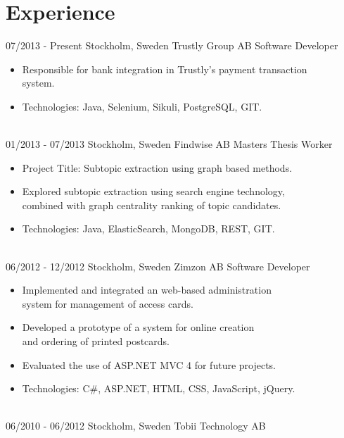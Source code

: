 \documentclass{markusos-cv}
\begin{document}

\section{Experience}

\begin{entrylist}
\entry
{07/2013 - Present}
{Stockholm, Sweden}
{Trustly Group AB}
{Software Developer} 
{
\begin{itemize}
\item Responsible for bank integration in Trustly's payment transaction\\ system.
\item Technologies: Java, Selenium, Sikuli, PostgreSQL, GIT.
\end{itemize}
}
\\%
\entry
{01/2013 - 07/2013}
{Stockholm, Sweden}
{Findwise AB}
{Masters Thesis Worker} 
{
\begin{itemize}
\item Project Title: Subtopic extraction using graph based methods.
\item Explored subtopic extraction using search engine technology,\\ combined with graph centrality ranking of topic candidates.
\item Technologies: Java, ElasticSearch, MongoDB, REST, GIT.
\end{itemize} 
}
\\%
\entry
{06/2012 - 12/2012}
{Stockholm, Sweden}
{Zimzon AB}
{Software Developer} 
{
\begin{itemize}
\item Implemented and integrated an web-based administration\\ system for management of access cards.
\item Developed a prototype of a system for online creation\\ and ordering of printed postcards.
\item Evaluated the use of ASP.NET MVC 4 for future projects.
\item Technologies: C\#, ASP.NET, HTML, CSS, JavaScript, jQuery.
\end{itemize} 
}
\\%
\entry
{06/2010 - 06/2012}
{Stockholm, Sweden}
{Tobii Technology AB}

\end{entrylist}
\end{document}
